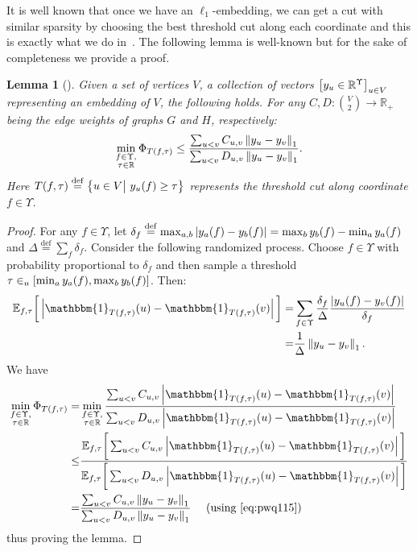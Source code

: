\documentclass{article}
\def\triangleq{\overset{\mathrm{def}}{=}}
\newtheorem{lemma}{Lemma}[section]
\newcommand{\R}{\mathbb{R}}
\newcommand{\ind}[1]{\mathbbm{1}_{#1}}
\newcommand{\expct}[2]{\mathbb{E}_{#1}\bigg[ #2 \bigg]}
\newcounter{alg-count}
\begin{document}
It is well known that once we have an $\ell_1$-embedding, we can get a
cut with similar sparsity by choosing the best threshold cut along
each coordinate and this is exactly what we do
in~.
The following lemma is well-known but for the sake of completeness we
provide a proof.
\begin{lemma}[\cite{llr}]
  \label{lem:l1-to-cut}
  Given a set of vertices $V$, a collection of vectors $\big[
  \yvec_{u} \in \R^{\Upsilon}\big]_{u \in V}$ representing an
  embedding of $V$, the following holds.  For any $C, D: \binom{V}{2}
  \to \R_+$ being the edge weights of graphs $G$ and $H$,
  respectively:
  \begin{equation}
    \min_{\substack{ f \in \Upsilon, \\ \tau \in \R} }
    \Phi_{T(f,\tau)} \le 
    \frac{ \sum_{u<v} C_{u,v} \left\| \yvec_u - \yvec_v \right\|_1 }
    { \sum_{u<v}D_{u,v} \left\| \yvec_u - \yvec_v \right\|_1 }.
    \label{eq:tcut-l1}
  \end{equation} 
  Here $T(f, \tau)\triangleq \left\{ u \in V\big|\ \yvec_u(f) \ge \tau
  \right\}$ represents the threshold cut along coordinate $f\in
  \Upsilon$.
\end{lemma}
\begin{proof}For any $f\in \Upsilon$, let $\delta_f \triangleq \max_{a,b} |
  \yvec_a(f)-\yvec_b(f) | = \max_b \yvec_b(f) - \min_{a} \yvec_a(f)$
  and $\Delta \triangleq \sum_f \delta_f$.
Consider the following randomized process.  Choose $f \in \Upsilon$
  with probability proportional to $\delta_f$ and then sample a
  threshold $\tau \in_u [\min_{a} {y}_a(f), \max_b {y}_b(f)]$.
  Then:
\begin{align}
    \label{eq:pwq115}
    \expct{f,\tau}{ \left|\ind{T(f,\tau)}(u) -
        \ind{T(f,\tau)}(v)\right| }
    = & \sum_{f\in \Upsilon} \frac{\delta_f}{\Delta} 
    \frac{|\yvec_u(f)-\yvec_v(f)|}{\delta_f}\\
    =& \frac{1}{\Delta} \left\| \yvec_u - \yvec_v\right\|_1. \notag
  \end{align}
We have
  \begin{align*}
    \min_{\substack{ f \in \Upsilon, \\ \tau \in \R} }
    \Phi_{T(f,\tau)} =& \min_{\substack{ f \in \Upsilon, \\ \tau \in
        \R}} \frac{\sum_{u<v} C_{u,v} \left|\ind{T(f,\tau)}(u) -
        \ind{T(f,\tau)}(v)\right| }{
      \sum_{u<v} D_{u,v} \left|\ind{T(f,\tau)}(u) - \ind{T(f,\tau)}(v)\right|}  \\
    \le & \frac{ \expct{f,\tau}{ \sum_{u<v} C_{u,v}
        \left|\ind{T(f,\tau)}(u) - \ind{T(f,\tau)}(v)\right| } }{
      \expct{f,\tau}{ \sum_{u<v} D_{u,v} \left|\ind{T(f,\tau)}(u) -
          \ind{T(f,\tau)}(v)\right|
      }} \\
    = & \frac{ \sum_{u<v} C_{u,v} \left\| \yvec_u - \yvec_v \right\|_1
    } { \sum_{u<v}D_{u,v} \left\| \yvec_u - \yvec_v \right\|_1 } \quad
    \mbox{ (using \cref{eq:pwq115})} \end{align*}
  thus proving the lemma.
\end{proof}			 
\end{document}
